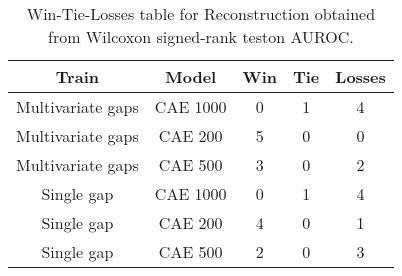 \begin{table}[H]
\centering
\begin{tabular}{|c|c|c|c|c|}

    \textbf{Train} & \textbf{Model} &  \textbf{Win} &  \textbf{Tie} &  \textbf{Losses} \\
\hline

 Multivariate gaps &       CAE 1000 &             0 &             1 &                4 \\
\hline
 Multivariate gaps &        CAE 200 &             5 &             0 &                0 \\
\hline
 Multivariate gaps &        CAE 500 &             3 &             0 &                2 \\
\hline
        Single gap &       CAE 1000 &             0 &             1 &                4 \\
\hline
        Single gap &        CAE 200 &             4 &             0 &                1 \\
\hline
        Single gap &        CAE 500 &             2 &             0 &                3 \\
\hline

\end{tabular}
\caption{Win-Tie-Losses table for Reconstruction obtained from Wilcoxon signed-rank teston AUROC.}
\label{tab:reconstruction_model_training_data_comparison}
\end{table}